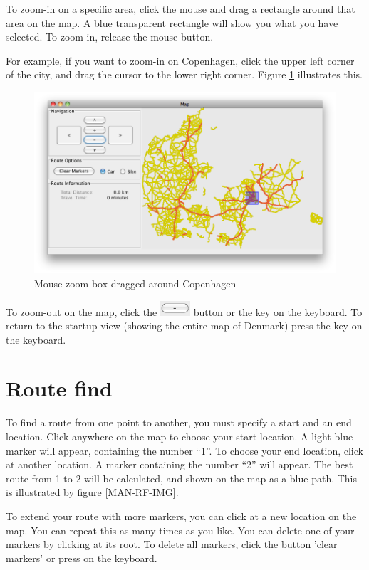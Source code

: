 To zoom-in on a specific area, click the mouse and drag a rectangle around that
area on the map. A blue transparent rectangle will show you what you have
selected. To zoom-in, release the mouse-button. 

For example, if you want to zoom-in on Copenhagen, click the upper left corner
of the city, and drag the cursor to the lower right corner. Figure
\ref{MAN-Z-COP} illustrates this.

\begin{figure}[h!]
\centering
\includegraphics[width=1\linewidth]{images/man-copenhagen.png}
\caption{Mouse zoom box dragged around Copenhagen}
\label{MAN-Z-COP}
\end{figure}

To zoom-out on the map, click the
\includegraphics[height=1.5em]{images/zoomoutbutton.png} button or the  
key on the keyboard. To return to the startup view (showing the entire map of
Denmark) press the  key on the keyboard. 
\section{Route find}
\label{MAN-RF}
To find a route from one point to another, you must specify a start and an end
location. Click anywhere on the map to choose your start location. A light blue
marker will appear, containing the number ``1''. To choose your end location,
click at another location. A marker containing the number ``2'' will appear. The
best route from 1 to 2 will be calculated, and shown on the map as a blue path.
This is illustrated by figure \ref{MAN-RF-IMG}.

To extend your route with more markers, you can click at a new location on the 
map. You can repeat this as many times as you like. You can delete one of
your markers by clicking at its root. To delete all markers, click the button
'clear markers' or press  on the keyboard.

